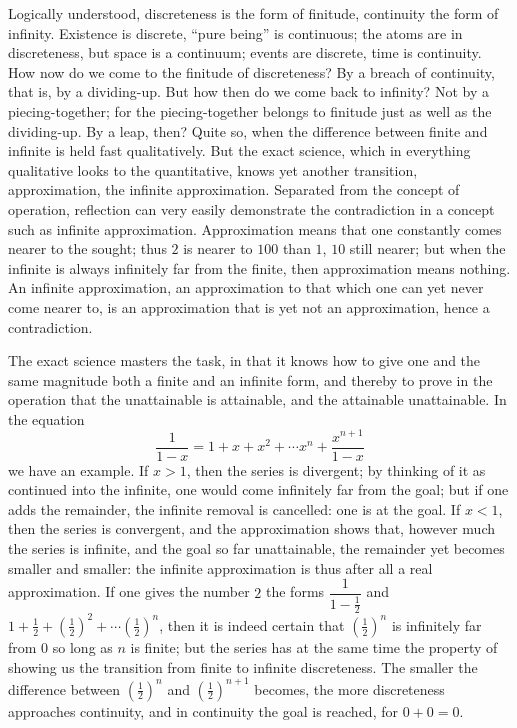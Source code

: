 \documentclass[12pt]{book}
\begin{document}
Logically understood, discreteness is the form of finitude, continuity the form of
infinity. Existence is discrete, ``pure being'' is continuous; the atoms are in
discreteness, but space is a continuum; events are discrete, time is continuity. How
now do we come to the finitude of discreteness? By a breach of continuity, that is, by
a dividing-up. But how then do we come back to infinity? Not by a piecing-together;
for the piecing-together belongs to finitude just as well as the dividing-up. By a leap,
then? Quite so, when the difference between finite and infinite is held fast
qualitatively. But the exact science, which in everything qualitative looks to the
quantitative, knows yet another transition, approximation, the infinite approximation.
Separated from the concept of operation, reflection can very easily demonstrate the
contradiction in a concept such as infinite approximation. Approximation means that one
constantly comes nearer to the sought; thus $2$ is nearer to $100$ than $1$, $10$ still
nearer; but when the infinite is always infinitely far from the finite, then
approximation means nothing. An infinite approximation, an approximation to that which
one can yet never come nearer to, is an approximation that is yet not an approximation,
hence a contradiction.

The exact science masters the task, in that it knows how to give one and the same
magnitude both a finite and an infinite form, and thereby to prove in the operation that
the unattainable is attainable, and the attainable unattainable. In the equation
\[
  \frac{1}{1-x} = 1 + x + x^2 + \cdots x^n + \frac{x^{n+1}}{1-x}
\]
we have an example. If $x > 1$, then the series is divergent; by thinking of it as
continued into the infinite, one would come infinitely far from the goal; but if one
adds the remainder, the infinite removal is cancelled: one is at the goal. If $x < 1$,
then the series is convergent, and the approximation shows that, however much the series
is infinite, and the goal so far unattainable, the remainder yet becomes smaller and
smaller: the infinite approximation is thus after all a real approximation. If one gives
the number $2$ the forms $\dfrac{1}{1-\frac12}$ and $1 + \frac12 +
\left(\tfrac12\right)^2 + \cdots \left(\tfrac12\right)^n$, then it is indeed certain that
$\left(\tfrac12\right)^n$ is infinitely far from $0$ so long as $n$ is finite; but the
series has at the same time the property of showing us the transition from finite to
infinite discreteness. The smaller the difference between $\left(\tfrac12\right)^n$ and
$\left(\tfrac12\right)^{n+1}$ becomes, the more discreteness approaches continuity, and
in continuity the goal is reached, for $0 + 0 = 0$.
\end{document}
